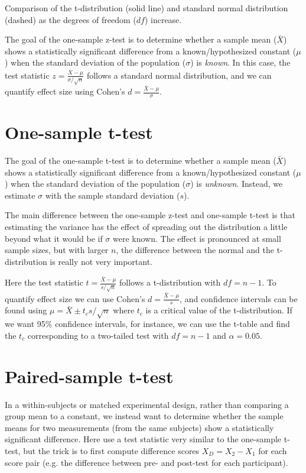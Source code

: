 \documentclass{tufte-handout}
\begin{document}
\begin{marginfigure}
  \label{fig:fullfig}%
  \caption{Comparison of the t-distribution (solid line) and standard normal distribution (dashed) as the degrees of freedom ($df$) increase.}
\end{marginfigure}

The goal of the one-sample z-test is to determine whether a sample mean ($\bar{X}$) shows a statistically significant difference from a known/hypothesized constant ($\mu$) when the standard deviation of the population ($\sigma$) is \emph{known}. In this case, the test statistic $z=\frac{\bar{X}-\mu}{\sigma/\sqrt{n}}$  follows a standard normal distribution, and we can quantify effect size using Cohen's $d=\frac{\bar{X}-\mu}{\sigma}$.


\section{One-sample t-test}

The goal of the one-sample t-test is to determine whether a sample mean ($\bar{X}$) shows a statistically significant difference from a known/hypothesized constant ($\mu$) when the standard deviation of the population ($\sigma$) is \emph{unknown}. Instead, we estimate $\sigma$ with the sample standard deviation ($s$).

The main difference between the one-sample z-test and one-sample t-test is that estimating the variance has the effect of spreading out the distribution a little beyond what it would be if $\sigma$ were known. The effect is pronounced at small sample sizes, but with larger $n$, the difference between the normal and the t-distribution is really not very important.

Here the test statistic $t=\frac{\bar{X}-\mu}{s/\sqrt{n}}$ follows a t-distribution with $df=n-1$. To quantify effect size we can use Cohen's $d=\frac{\bar{X}-\mu}{s}$, and confidence intervals can be found using $\mu=\bar{X}\pm t_cs/\sqrt{n}$  where $t_c$  is a critical value of the t-distribution. If we want 95$\%$ confidence intervals, for instance, we can use the t-table and find the $t_c$ corresponding to a two-tailed test with $df=n-1$  and $\alpha=0.05$.

\section{Paired-sample t-test}
In a within-subjects or matched experimental design, rather than comparing a group mean to a constant, we instead want to determine whether the sample means for two measurements (from the same subjects) show a statistically significant difference. Here use a test statistic very similar to the one-sample t-test, but the trick is to first compute difference scores $X_D=X_2-X_1$  for each score pair (e.g. the difference between pre- and post-test for each participant).
\end{document}
